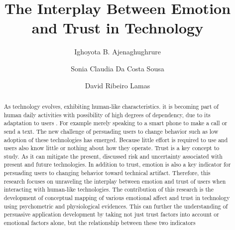 \documentclass[sigconf]{acmart}
\begin{document}
\title{The Interplay Between Emotion and Trust in Technology  }
\author{Ighoyota B. Ajenaghughrure}

\author{Sonia Claudia Da Costa Sousa}

\author{David Ribeiro Lamas}

\renewcommand{\shortauthors}{Ajenaghughrure et al.}


\begin{abstract}
As technology evolves, exhibiting human-like characteristics. it is becoming part of human daily activities with possibility of high degrees of dependency, due to its adaptation to users . For example merely speaking to a smart phone to make a call or send a text. The new challenge of persuading users to change behavior such as low adoption of these technologies has emerged. Because little effort is required to use and users also know little or nothing about how they operate.
 Trust is a key concept to study. As it can mitigate the present, discussed risk and uncertainty associated with present and future technologies. In addition to trust, emotion is also a key indicator for persuading users to changing behavior toward technical artifact.
Therefore, this research focuses on unraveling the interplay between emotion and trust of users when interacting with human-like technologies. The contribution of this research is the development of conceptual mapping of various emotional affect and trust in technology using psychometric and physiological evidences. This can further the understanding of persuasive application development by taking not just trust factors into account or emotional factors alone, but the relationship between these two indicators

\end{abstract}
\end{document}
